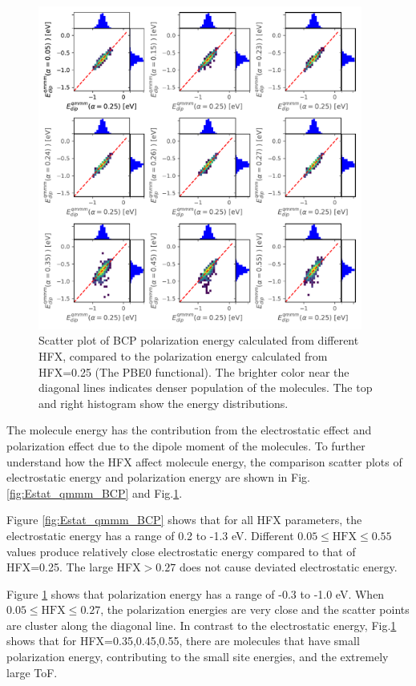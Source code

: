 \documentclass[letterpaper,12pt]{article}
\begin{document}
\begin{figure}[H]
    \centering
    \includegraphics[width=0.95\textwidth]{figs/BCP_HFX/scatterEdip_qmmm.pdf}
    \caption{Scatter plot of BCP polarization energy calculated from different HFX, compared to the polarization energy calculated from HFX=0.25 (The PBE0 functional). The brighter color near the diagonal lines indicates denser population of the molecules.  The top and right histogram show the energy distributions.}
    \label{fig:Edip_qmmm_BCP}
\end{figure}


The molecule energy has the contribution from the electrostatic effect and polarization effect due to the dipole moment of the molecules. To further understand how the HFX affect molecule energy, the comparison scatter plots of electrostatic energy and polarization energy are shown in Fig.\ref{fig:Estat_qmmm_BCP} and Fig.\ref{fig:Edip_qmmm_BCP}. 

Figure \ref{fig:Estat_qmmm_BCP} shows that for all HFX parameters, the electrostatic energy has a range of 0.2 to -1.3 eV. Different $0.05 \leq \text{HFX} \leq 0.55$ values produce relatively close electrostatic energy compared to that of HFX=0.25. 
The large HFX$>0.27$ does not cause deviated electrostatic energy. 

Figure \ref{fig:Edip_qmmm_BCP} shows that polarization energy has a range of -0.3 to -1.0 eV. When $0.05 \leq \text{HFX} \leq 0.27$, the polarization energies are very close and the scatter points are cluster along the diagonal line. 
In contrast to the electrostatic energy, Fig.\ref{fig:Edip_qmmm_BCP} shows that for HFX=0.35,0.45,0.55, there are molecules that have small polarization energy, contributing to the small site energies, and the extremely large ToF. 
\end{document}
